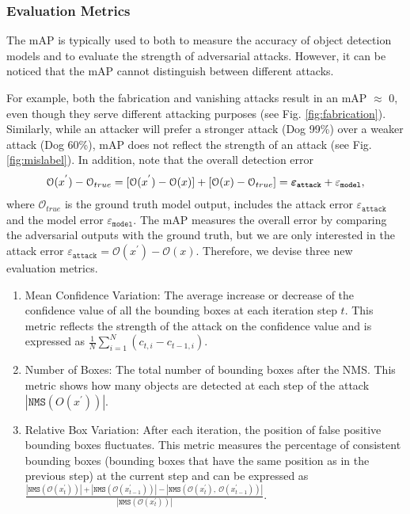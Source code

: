 
\subsubsection{Evaluation Metrics}

The mAP \citep{cartucho2018} is typically used to both to measure the accuracy of object detection models and to evaluate the strength of adversarial attacks. However, it can be noticed that the mAP cannot distinguish between different attacks. 

For example, both the fabrication and vanishing attacks result in an mAP $\approx$ 0, even though they serve different attacking purposes (see Fig. \ref{fig:fabrication}). Similarly, while an attacker will prefer a stronger attack (Dog 99\%) over a weaker attack (Dog 60\%), mAP does not reflect the strength of an attack (see Fig. \ref{fig:mislabel}).
In addition, note that the overall detection error 
\begin{align}
\begin{split}
\mathcal{O}(x^{'}) - \mathcal{O}_{true} = [\mathcal{O}(x^{'}) - \mathcal{O}(x)] + [\mathcal{O}(x) - \mathcal{O}_{true}] = \bm{\varepsilon}_{\textbf{\texttt{attack}}} + \varepsilon_{\texttt{model}},
\end{split}
\end{align}
where $\mathcal{O}_{true}$ is the ground truth model output, includes the attack error $\varepsilon_{\texttt{attack}}$ and the model error $\varepsilon_{\texttt{model}}$. The mAP measures the overall error by comparing the adversarial outputs with the ground truth, but we are only interested in the attack error $\varepsilon_{\texttt{attack}}=\mathcal{O}(x^{'}) - \mathcal{O}(x)$.
Therefore, we devise three new evaluation metrics. 
\begin{enumerate}
    \item Mean Confidence Variation: The average increase or decrease of the confidence value of all the bounding boxes at each iteration step $t$. This metric reflects the strength of the attack on the confidence value and is expressed as $\frac{1}{N}\sum_{i=1}^{N}{( c_{t,i} - c_{t-1,i} )}$.
    \item Number of Boxes: The total number of bounding boxes after the NMS. This metric shows how many objects are detected at each step of the attack $|\texttt{NMS}(O(x^{'}))|$.
    \item Relative Box Variation: After each iteration, the position of false positive bounding boxes fluctuates. This metric measures the percentage of consistent bounding boxes (bounding boxes that have the same position as in the previous step) at the current step and can be expressed as $\frac{|\texttt{NMS}(\mathcal{O}(x_t^{'}))| + |\texttt{NMS}(\mathcal{O}(x_{t-1}^{'}))| - |\texttt{NMS}(\mathcal{O}(x_{t}^{'}),\ \mathcal{O}(x_{t-1}^{'}))|}{|\texttt{NMS}(\mathcal{O}(x_t^{'}))|}$.
\end{enumerate}

